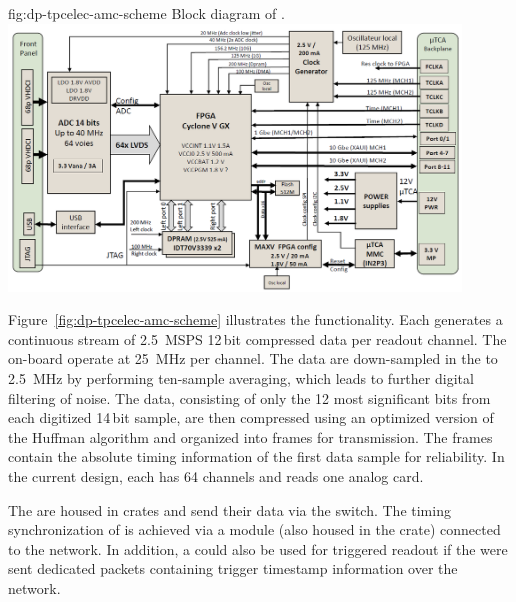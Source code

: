 \begin{dunefigure}{fig:dp-tpcelec-amc-scheme}
{Block diagram of  .}
\includegraphics[width=0.9\textwidth]{graphics/dp-tpcelec-amc-scheme}
\end{dunefigure}
Figure~\ref{fig:dp-tpcelec-amc-scheme} illustrates %
the  functionality. Each  generates a continuous  stream of \SI{2.5}{MSPS} \num{12}\,bit compressed data per readout channel. The on-board  operate at  \SI{25}{\MHz} per channel. The data are down-sampled in the  to \SI{2.5}{\MHz} by performing ten-sample averaging, which leads to further digital filtering of noise. The data, consisting of only the  \num{12} most significant bits from each digitized \num{14}\,bit sample, are then compressed using an optimized version of the Huffman algorithm \cite{Wu:2010zzk} and organized into frames for transmission.  The frames contain the absolute timing information of the first data sample for reliability. In the current design, each  has \num{64} channels and reads one analog  card.


The  are housed in  crates and send their data via the  switch. The timing synchronization of  is achieved via a  module (also housed in the crate) connected to the  network. In addition, a   could also be used for triggered  readout %
if the  were sent dedicated packets containing trigger timestamp information over the  network.

